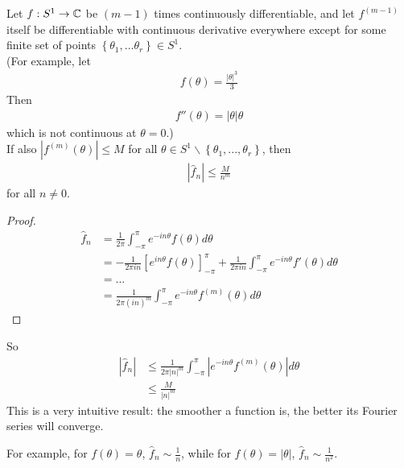 \documentclass[a4paper]{article}
\begin{document}
\begin{lemma}
Let $f:S^1 \to \mathbb{C}$ be $\left(m-1\right)$ times continuously differentiable, and let $f^{\left(m-1\right)}$ itself be differentiable with continuous derivative everywhere except for some finite set of points $\left\{\theta_1,...\theta_r\right\} \in S^1$.\\
(For example, let 
\begin{equation*}
\begin{aligned}
f\left(\theta\right) = \frac{|\theta|^3}{3}
\end{aligned}
\end{equation*}
Then
\begin{equation*}
\begin{aligned}
f''\left(\theta\right)= |\theta| \theta
\end{aligned}
\end{equation*}
which is not continuous at $\theta = 0$.)\\
If also $|f^{\left(m\right)} \left(\theta\right)| \leq M$ for all $\theta \in S^1 \backslash \left\{\theta_1,...,\theta_r\right\}$, then
\begin{equation*}
\begin{aligned}
\left|\hat{f}_n\right| \leq \frac{M}{n^m}
\end{aligned}
\end{equation*}
for all $n \neq 0$.
\begin{proof}
\begin{equation*}
\begin{aligned}
\hat{f}_n &= \frac{1}{2\pi} \int_{-\pi}^\pi e^{-in\theta} f\left(\theta\right) d\theta\\
&= - \frac{1}{2\pi in} \left[e^{in\theta} f\left(\theta\right) \right]_{-\pi}^\pi + \frac{1}{2\pi in} \int_{-\pi}^\pi e^{-in\theta} f'\left(\theta\right) d\theta\\
&= ...\\
&= \frac{1}{2\pi \left(in\right)^m} \int_{-\pi}^\pi e^{-in\theta} f^{\left(m\right)} \left(\theta\right) d\theta
\end{aligned}
\end{equation*}
\end{proof}
So
\begin{equation*}
\begin{aligned}
\left|\hat{f}_n \right| &\leq \frac{1}{2\pi |n|^m} \int_{-\pi}^\pi \left|e^{-in\theta} f^{\left(m\right)} \left(\theta\right)\right| d\theta\\
&\leq \frac{M}{|n|^m}
\end{aligned}
\end{equation*}
This is a very intuitive result: the smoother a function is, the better its Fourier series will converge.

For example, for $f\left(\theta\right) = \theta$, $\hat{f}_n \sim \frac{1}{n}$, while for $f\left(\theta\right) = |\theta|$, $\hat{f}_n \sim \frac{1}{n^2}$.
\end{lemma}
\end{document}
